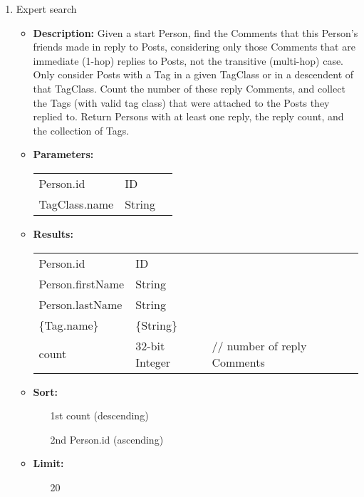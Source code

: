 {\begin{enumerate}
    \item Expert search
        \begin{itemize}
            \item \textbf{Description:}
                Given a start Person, find the Comments that this Person's
                friends made in reply to Posts, considering only those Comments
                that are immediate (1-hop) replies to Posts, not the transitive
                (multi-hop) case.  Only consider Posts with a Tag in a given
                TagClass or in a descendent of that TagClass.  Count the number
                of these reply Comments, and collect the Tags (with valid tag
                class) that were attached to the Posts they replied to.  Return
                Persons with at least one reply, the reply count, and
                the collection of Tags.  
            \item \textbf{Parameters:} \\
                \begin{tabular}{lll}
                    Person.id 	 					& ID & \parbox[t]{20cm}{\par \strut} \\
                    TagClass.name	 				& String & \parbox[t]{20cm}{\par \strut} \\
                \end{tabular}		
            \item \textbf{Results:} \\
                \begin{tabular}{lll}
                    Person.id 	 			& ID & \parbox[t]{20cm}{\par \strut} \\
                    Person.firstName 	 	& String & \parbox[t]{20cm}{\par \strut} \\
                    Person.lastName 	 	& String & \parbox[t]{20cm}{\par \strut} \\
                    \{Tag.name\} 	 			& \{String\} & \parbox[t]{20cm}{\par \strut} \\
                    count 	 				& 32-bit Integer & \parbox[t]{20cm}{// number of reply Comments\par \strut}
                \end{tabular}		
            \item \textbf{Sort:}
                  \begin{itemize}
                    \item[1st] count (descending)
                    \item[2nd] Person.id (ascending)
                  \end{itemize}
            \item \textbf{Limit:}
                  \begin{itemize}
                    \item[] 20
                  \end{itemize}
        \end{itemize}


\end{enumerate}}
